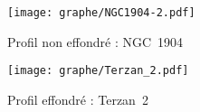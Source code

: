 	\begin{figure}[ht!]
		\begin{minipage}[b]{0.48\linewidth}
			\begin{center}
				\texttt{[image: graphe/NGC1904-2.pdf]}
				\caption{\footnotesize{Profil non effondré : \mbox{NGC 1904}} \label{pas_effondre}}
			\end{center}
		\end{minipage}\hfill
		\begin{minipage}[b]{0.48\linewidth}
			\begin{center}
				\texttt{[image: graphe/Terzan\_2.pdf]}
				\caption{\footnotesize{Profil effondré : \mbox{Terzan 2}} \label{effondre}}
			\end{center}
		\end{minipage}
	\end{figure}
\normalsize
